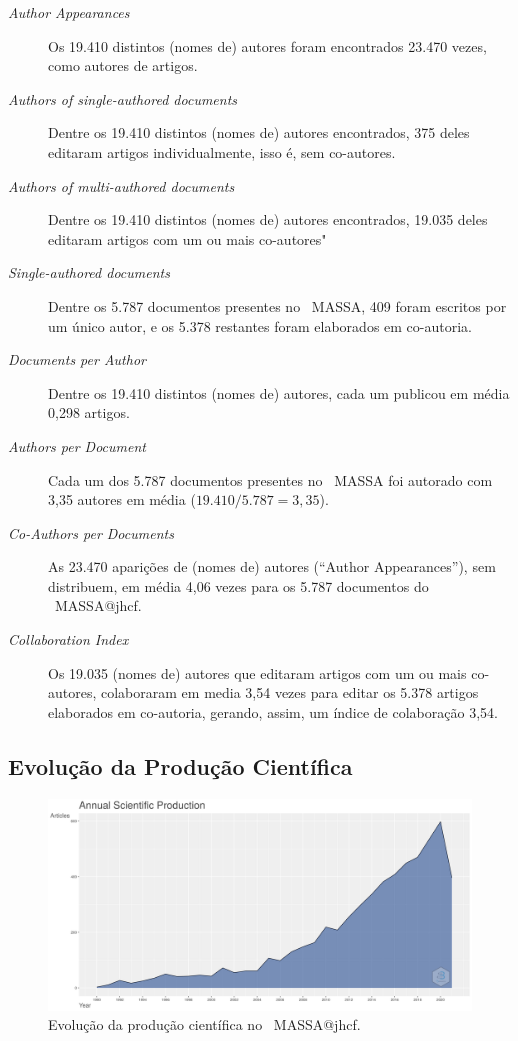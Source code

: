 \begin{description}
    \item [\textit{Author Appearances}] Os 19.410 distintos (nomes de) autores foram encontrados 23.470 vezes, como autores de artigos.
    \item [\textit{Authors of single-authored documents}] Dentre os 19.410 distintos (nomes de) autores encontrados, 375 deles editaram artigos individualmente, isso é, sem co-autores.
    \item [\textit{Authors of multi-authored documents}] Dentre os 19.410 distintos (nomes de) autores encontrados, 19.035 deles editaram artigos com um ou mais co-autores"
    \item [\textit{Single-authored documents}] Dentre os 5.787 documentos presentes no \dataset\   MASSA, 409 foram escritos por um único autor, e os 5.378 restantes foram elaborados em co-autoria.
    \item [\textit{Documents per Author}] Dentre os 19.410 distintos (nomes de) autores, cada um publicou em média 0,298 artigos.
    \item [\textit{Authors per Document}] Cada um dos 5.787 documentos presentes no \dataset\   MASSA foi autorado com 3,35 autores em média ($19.410 / 5.787 = 3,35$).
    \item [\textit{Co-Authors per Documents}] As 23.470 aparições de (nomes de) autores (``Author Appearances''), sem distribuem, em média 4,06 vezes para os 5.787 documentos do \dataset\   MASSA@jhcf.
    \item [\textit{Collaboration Index}] Os 19.035 (nomes de) autores que editaram artigos com um ou mais co-autores, colaboraram em media 3,54 vezes para editar os 5.378 artigos elaborados em co-autoria, gerando, assim, um índice de colaboração 3,54. 
\end{description}



\subsection{Evolução da Produção Científica}

\begin{figure}
    \centering
    \includegraphics[width=1\textwidth]{exploratory-data-analysis/jhcf/PesqBibliogr/SimulacaoMultiagente/WoS-20210803/classico-mais-citacoes/Dataset/AnnualScientificProduction-2021-08-05.png}
    \caption{Evolução da produção científica no \dataset\   MASSA@jhcf.}
    \label{fig:evol:anual:MASSA@jhcf}
\end{figure}

